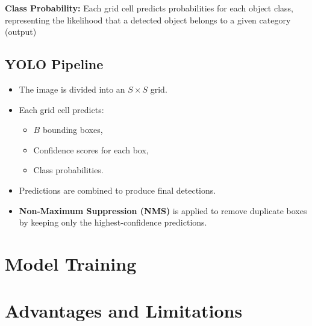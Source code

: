 \documentclass[12pt, a4paper]{article}
\begin{document}
\textbf{Class Probability:} Each grid cell predicts probabilities for each object class, representing the likelihood that a detected object belongs to a given category (output)

\subsection{YOLO Pipeline}

\begin{itemize}
	\item The image is divided into an $S \times S$ grid.
	\item Each grid cell predicts:
	\begin{itemize}
		\item $B$ bounding boxes,
		\item Confidence scores for each box,
		\item Class probabilities.
	\end{itemize}
	\item Predictions are combined to produce final detections.
	\item \textbf{Non-Maximum Suppression (NMS)} is applied to remove duplicate boxes by keeping only the highest-confidence predictions.
\end{itemize}


\section{Model Training}


\section{Advantages and Limitations}
\end{document}

